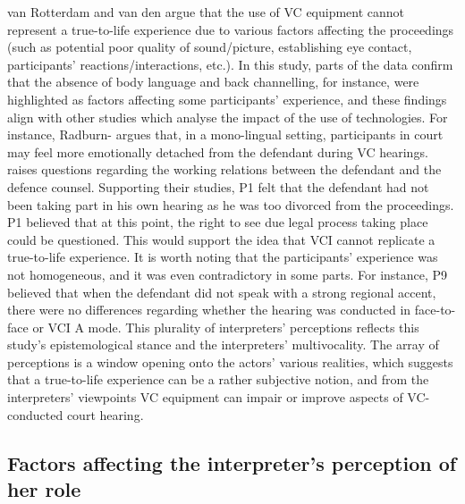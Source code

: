 \documentclass[output=paper]{langsci/langscibook}
\begin{document}
van Rotterdam and van den \citet{Hoogen2011} argue that the use of VC equipment cannot represent a true-to-life experience due to various factors affecting the proceedings (such as potential poor quality of sound/picture, establishing eye contact, participants’ reactions/interactions, etc.). In this study, parts of the data confirm that the absence of body language and back channelling, for instance, were highlighted as factors affecting some participants’ experience, and these findings align with other studies which analyse the impact of the use of technologies. For instance, Radburn-\citet{Remfry1994} argues that, in a mono-lingual setting, participants in court may feel more emotionally detached from the defendant during VC hearings. \citet{Hodges2008} raises questions regarding the working relations between the defendant and the defence counsel. Supporting their studies, P1 felt that the defendant had not been taking part in his own hearing as he was too divorced from the proceedings. P1 believed that at this point, the right to see due legal process taking place could be questioned. This would support the idea that VCI cannot replicate a true-to-life experience. It is worth noting that the participants’ experience was not homogeneous, and it was even contradictory in some parts. For instance, P9 believed that when the defendant did not speak with a strong regional accent, there were no differences regarding whether the hearing was conducted in face-to-face or VCI A mode. This plurality of interpreters’ perceptions reflects this study’s epistemological stance and the interpreters’ multivocality. The array of perceptions is a window opening onto the actors’ various realities, which suggests that a true-to-life experience can be a rather subjective notion, and from the interpreters’ viewpoints VC equipment can impair or improve aspects of VC-conducted court hearing.

\subsection{Factors affecting the interpreter’s perception of her role}
\end{document}
